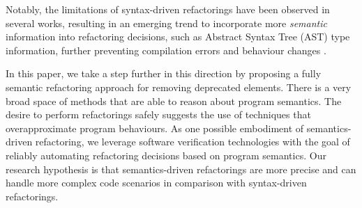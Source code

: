 \documentclass[runningheads,a4paper]{llncs}
\begin{document}
%
%


Notably, the limitations of syntax-driven refactorings have been observed
in several works, resulting in an emerging trend to incorporate more {\em semantic}
information into refactoring decisions, such as Abstract Syntax Tree (AST) 
type information,
further preventing compilation errors and behaviour changes
\cite{Steimann2011,Steimann2012Pilgrim,Steimann2011KollePilgrim}.

In this paper, we take a step further in this direction by proposing a
fully semantic refactoring approach for removing deprecated elements.
There is a very broad space of methods that are able to reason about
program semantics.  The desire to perform refactorings safely suggests
the use of techniques that overapproximate program behaviours.  As one
possible embodiment of semantics-driven refactoring, we leverage
software verification technologies with the goal of reliably
automating refactoring decisions based on program semantics.
Our research
hypothesis is that semantics-driven refactorings are more precise and
can handle more complex code scenarios in comparison with
syntax-driven refactorings.
\end{document}
